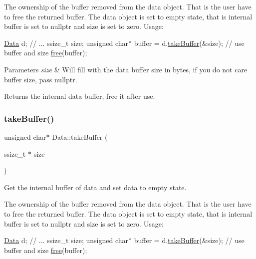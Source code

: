 The ownership of the buffer removed from the data object. That is the user have to free the returned buffer. The data object is set to empty state, that is internal buffer is set to nullptr and size is set to zero. Usage\+: 
\begin{DoxyCode}
\hyperlink{classData}{Data} d;
\textcolor{comment}{// ...}
ssize\_t size;
\textcolor{keywordtype}{unsigned} \textcolor{keywordtype}{char}* buffer = d.\hyperlink{classData_a01e95fc47766e7d4cbfea893e02d0479}{takeBuffer}(&size);
\textcolor{comment}{// use buffer and size}
\hyperlink{namespaceDrawPrimitives_a1a20eab15f5a2560e8ebaa1fddde8216}{free}(buffer);
\end{DoxyCode}



\begin{DoxyParams}{Parameters}
{\em size} & Will fill with the data buffer size in bytes, if you do not care buffer size, pass nullptr. \\
\hline
\end{DoxyParams}
\begin{DoxyReturn}{Returns}
the internal data buffer, free it after use. 
\end{DoxyReturn}
\mbox{\label{classData_a3fe0976fa60f3bd9fe9f4f7ab40574e4}} 
\subsubsection{\texorpdfstring{take\+Buffer()}{takeBuffer()}\hspace{0.1cm}{\footnotesize\ttfamily [2/2]}}
{\footnotesize\ttfamily unsigned char$\ast$ Data\+::take\+Buffer (\begin{DoxyParamCaption}\item[{ssize\+\_\+t $\ast$}]{size }\end{DoxyParamCaption})}

Get the internal buffer of data and set data to empty state.

The ownership of the buffer removed from the data object. That is the user have to free the returned buffer. The data object is set to empty state, that is internal buffer is set to nullptr and size is set to zero. Usage\+: 
\begin{DoxyCode}
\hyperlink{classData}{Data} d;
\textcolor{comment}{// ...}
ssize\_t size;
\textcolor{keywordtype}{unsigned} \textcolor{keywordtype}{char}* buffer = d.\hyperlink{classData_a01e95fc47766e7d4cbfea893e02d0479}{takeBuffer}(&size);
\textcolor{comment}{// use buffer and size}
\hyperlink{namespaceDrawPrimitives_a1a20eab15f5a2560e8ebaa1fddde8216}{free}(buffer);
\end{DoxyCode}




